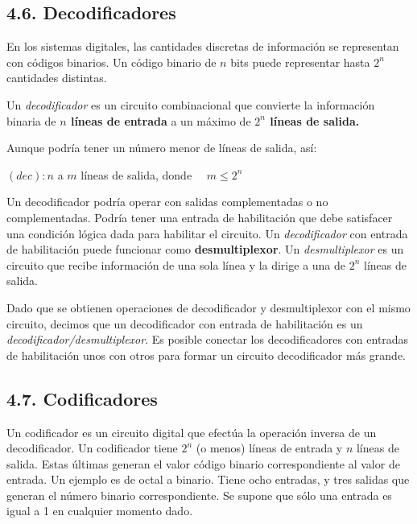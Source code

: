 \subsection*{4.6. Decodificadores}
En los sistemas digitales, las cantidades discretas de informaci\'{o}n se representan con c\'{o}digos binarios.
Un c\'{o}digo binario de $n$ bits puede representar hasta $2^n$ cantidades distintas.
\begin{center}
    Un \textit{decodificador} es un circuito combinacional que convierte la informaci\'{o}n binaria de \textbf{$n$ l\'{i}neas
    de entrada} a un m\'{a}ximo de \textbf{$2^n$ l\'{i}neas de salida.}
\end{center}
\begin{flushleft}
    Aunque podr\'{i}a tener un n\'{u}mero menor de l\'{i}neas de salida, as\'{i}: \\
    \begin{center}
        $(dec): n$ a $m$ l\'{i}neas de salida, donde $\quad m \leq 2^n$
    \end{center}
\end{flushleft}

Un decodificador podr\'{i}a operar con salidas complementadas o no complementadas. Podr\'{i}a tener
una entrada de habilitaci\'{o}n que debe satisfacer una condici\'{o}n l\'{o}gica dada para habilitar
el circuito. Un \textit{decodificador} con entrada de habilitaci\'{o}n puede funcionar como \textbf{desmultiplexor}.
Un \textit{desmultiplexor} es un circuito que recibe informaci\'{o}n de una sola l\'{i}nea y la dirige a una
de $2^n$ l\'{i}neas de salida.

Dado que se obtienen operaciones de decodificador y desmultiplexor con el mismo circuito, decimos que un
decodificador con entrada de habilitaci\'{o}n es un \textit{decodificador/desmultiplexor}.
Es posible conectar los decodificadores con entradas de habilitaci\'{o}n unos con otros para formar un circuito
decodificador m\'{a}s grande.

\subsection*{4.7. Codificadores}
Un codificador es un circuito digital que efect\'{u}a la operaci\'{o}n inversa de un decodificador. Un codificador
tiene $2^n$ (o menos) l\'{i}neas de entrada y $n$ l\'{i}neas de salida. Estas \'{u}ltimas generan el valor c\'{o}digo
binario correspondiente al valor de entrada. Un ejemplo es de octal a binario. Tiene ocho entradas, y tres salidas que
generan el n\'{u}mero binario correspondiente. Se supone que s\'{o}lo una entrada es igual a 1 en cualquier momento dado.

